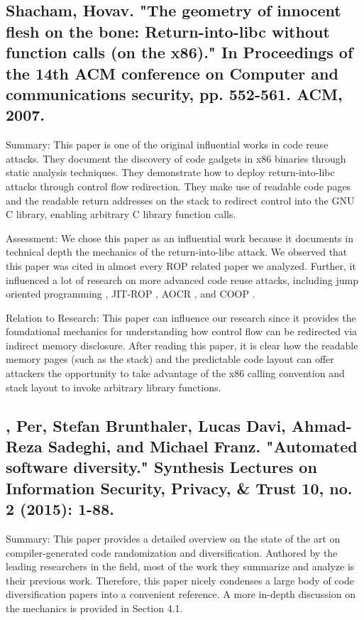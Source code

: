 \documentclass[preprint,12pt]{elsarticle}
\begin{document}
\subsection{
\cite{shacham2007geometry} Shacham, Hovav. "The geometry of innocent flesh on the bone: Return-into-libc without function calls (on the x86)." In Proceedings of the 14th ACM conference on Computer and communications security, pp. 552-561. ACM, 2007.
}

Summary: This paper is one of the original influential works in code reuse attacks. They document the discovery of code gadgets in x86 binaries through static analysis techniques. They demonstrate how to deploy return-into-libc attacks through control flow redirection. They make use of readable code pages and the readable return addresses on the stack to redirect control into the GNU C library, enabling arbitrary C library function calls.

Assessment: We chose this paper as an influential work because it documents in technical depth the mechanics of the return-into-libc attack. We observed that this paper was cited in almost every ROP related paper we analyzed. Further, it influenced a lot of research on more advanced code reuse attacks, including jump oriented programming \cite{bletsch2011jump}, JIT-ROP \cite{snow2013just}, AOCR \cite{rudd2017address}, and COOP \cite{schuster2015counterfeit}.

Relation to Research: This paper can influence our research since it provides the foundational mechanics for understanding how control flow can be redirected via indirect memory disclosure. After reading this paper, it is clear how the readable memory pages (such as the stack) and the predictable code layout can offer attackers the opportunity to take advantage of the x86 calling convention and stack layout to invoke arbitrary library functions.

\subsection{
\cite{larsen2015automated}, Per, Stefan Brunthaler, Lucas Davi, Ahmad-Reza Sadeghi, and Michael Franz. "Automated software diversity." Synthesis Lectures on Information Security, Privacy, \& Trust 10, no. 2 (2015): 1-88.
}

Summary: This paper provides a detailed overview on  the state of the art on compiler-generated code randomization and diversification. Authored by the leading researchers in the field, most of the work they summarize and analyze is their previous work. Therefore, this paper nicely condenses a large body of code diversification papers into a convenient reference. A more in-depth discussion on the mechanics is provided in Section 4.1.
\end{document}
